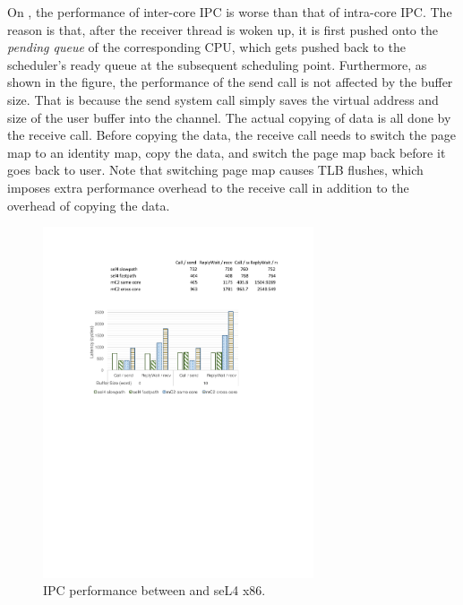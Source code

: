 On {\mCTOS}, the performance of inter-core IPC is worse than that of
intra-core IPC.  The reason is that, after the receiver thread is
woken up, it is first pushed onto the \emph{pending queue} of the
corresponding CPU, which gets pushed back to the scheduler's ready
queue at the subsequent scheduling point. Furthermore, as shown in the
figure, the performance of the send call is not affected by the buffer
size. That is because the send system call simply saves the virtual
address and size of the user buffer into the channel.  The actual
copying of data is all done by the receive call.  Before copying the
data, the receive call needs to switch the page map to an identity
map, copy the data, and switch the page map back before it goes back
to user. Note that switching page map causes TLB flushes, which
imposes extra performance overhead to the receive call in addition to
the overhead of copying the data.

\begin{figure}
	\begin{center}
		\vspace{-.2cm}
		\hspace{-.2cm}
		\includegraphics[width=8cm]{figs/ipc.pdf}
		\hspace{-.2cm}
		\vspace{.0cm}
		\vspace{-10pt}	
		\caption{IPC performance between \mCTOS{} and  seL4 x86.}
		\label{fig:eval_ipc}
	\end{center}
\vspace{-20pt}
\end{figure}


